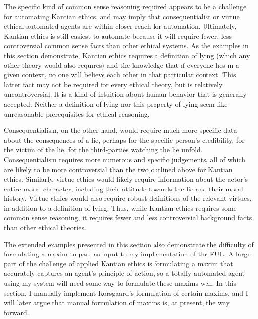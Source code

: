 \begin{isabellebody}
\begin{isamarkuptext}
The specific kind of common sense reasoning required appears to be a challenge 
for automating Kantian ethics, and may imply that consequentialist or virtue ethical automated
agents are within closer reach for automation. Ultimately, Kantian ethics is still
easiest to automate because it will require fewer, less controversial common sense facts than other ethical
systems. As the examples in this section demonstrate, Kantian ethics requires a definition of lying (which any other 
theory would also requires) and the knowledge that if everyone lies in a given context, no one will believe 
each other in that particular context. This latter fact may not be required for every ethical theory, 
but is relatively uncontroversial. It is a kind of intuition about human behavior that is generally accepted. 
Neither a definition of lying nor this property of lying seem like unreasonable prerequisites for ethical reasoning. 

Consequentialism, on the other hand, would require much more specific data about the consequences of 
a lie, perhaps for the specific person's credibility, for the victim of the lie, for the third-parties 
watching the lie unfold. Consequentialism requires more numerous and specific judgements, all of which are 
likely to be more controversial than the two outlined above for Kantian ethics. Similarly, virtue ethics
would likely require information about the actor's entire moral character, including their attitude
towards the lie and their moral history. Virtue ethics would also require robust definitions of the 
relevant virtues, in addition to a definition of lying. Thus, while Kantian ethics requires some 
common sense reasoning, it requires fewer and less controversial background facts than other ethical theories.

The extended examples presented in this section also demonstrate the difficulty of formulating a 
maxim to pass as input to my implementation of the FUL. A large part of the challenge of applied Kantian
ethics is formulating a maxim that accurately captures an agent's principle of action, so a totally
automated agent using my system will need some way to formulate these maxims well. In this section,
I manually implement Korsgaard's formulation of certain maxims, and I will later argue that manual formulation
of maxims is, at present, the way forward. 


\end{isamarkuptext}
\end{isabellebody}
